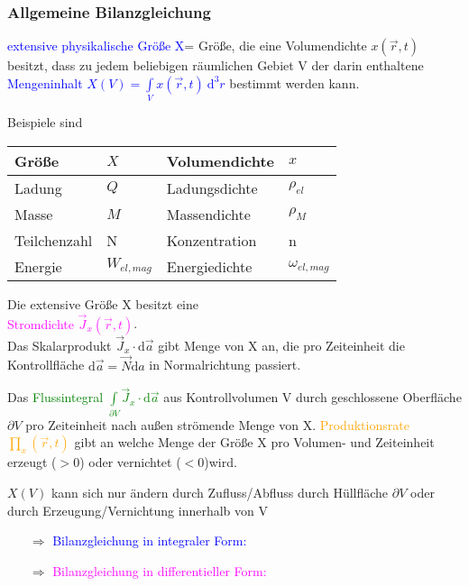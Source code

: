 \documentclass[]{article}
\newcommand{\dd}{\ensuremath{\text{d}}}
\begin{document}
\subsubsection{Allgemeine Bilanzgleichung}
	\textcolor{blue}{extensive physikalische Größe X}= Größe, die eine Volumendichte $x(\vec{r},t)$ besitzt, dass zu jedem beliebigen räumlichen Gebiet V der darin enthaltene \textcolor{blue}{Mengeninhalt $X(V)=\int\limits_V x(\vec{r},t) \ \dd^3 r$ } bestimmt werden kann. 
		\begin{multicols}{2}
		Beispiele sind \\
			\begin{tabular}{|C{1,4cm}C{1cm}|C{1,8cm}C{1cm}|} 
				\hline Größe & $X$ & Volumendichte & $x$ 
				\tabularnewline	
				\hline Ladung &$Q$ & Ladungsdichte& $\rho_{el}$
				\tabularnewline
				Masse &$M$&Massendichte &$\rho_M$
				\tabularnewline
				Teilchenzahl& N &Konzentration& n
				\tabularnewline
				Energie&$W_{el,mag}$&Energiedichte &$	\omega_{el,mag}$
				\tabularnewline
				\hline
			\end{tabular}
		\columnbreak

		Die extensive Größe X besitzt eine 
		\\\textcolor{magenta}{Stromdichte $\vec{J}_x(\vec{r},t)$}. 
		\\Das Skalarprodukt $\vec{J}_x\cdot \dd\vec{a}$ gibt Menge von X an, die pro Zeiteinheit die Kontrollfläche $\dd\vec{a}=\vec{N} \dd a$ in Normalrichtung passiert.
	\end{multicols}
	
	 Das \textcolor{green}{Flussintegral $\int\limits_{\partial V} \vec{J}_x \cdot \dd \vec{a}$} aus Kontrollvolumen V durch geschlossene Oberfläche $\partial V$ pro Zeiteinheit nach außen strömende Menge von X.
	\textcolor{orange}{Produktionsrate $\prod_x (\vec{r},t)$ }gibt an welche Menge der Größe X pro Volumen- und Zeiteinheit erzeugt ($>0$) oder vernichtet ($<0$)wird.

\newpage

	$X(V)$ kann sich nur ändern durch Zufluss/Abfluss durch Hüllfläche $\partial V$ oder durch Erzeugung/Vernichtung innerhalb von V 
	
	\begin{itemize}
		\item[$\Rightarrow$] 
			\textcolor{blue}{Bilanzgleichung in integraler Form: \fbox{$\frac{\dd X(V)}{\dd t}=\int\limits_V \frac{\partial x}{\partial t}(\vec{r},t) \ \dd^3 r= -\int\limits_{\partial V} \vec{J}_x\ \dd \vec{a} + \int\limits_V \prod_x \ \dd^3 r$}}
		\item[$\Rightarrow$] 
			\textcolor{magenta}{Bilanzgleichung in differentieller Form: }
	\end{itemize}
	
\end{document}
